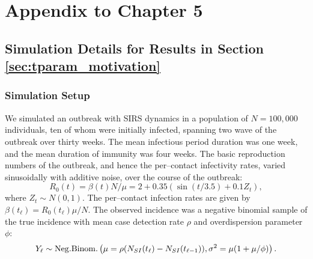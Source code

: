 \chapter{Appendix to Chapter 5}
\label{chap:appendix_ch5}

\section{Simulation Details for Results in Section \ref{sec:tparam_motivation}}
\label{sec:tparam_motiv_details}

\subsection{Simulation Setup}
\label{subsec:tparam_motiv_setup}

We simulated an outbreak with SIRS dynamics in a population of $ N= 100,000$ individuals, ten of whom were initially infected, spanning two wave of the outbreak over thirty weeks. The mean infectious period duration was one week, and the mean duration of immunity was four weeks. The basic reproduction numbers of the outbreak, and hence the per--contact infectivity rates, varied sinusoidally with additive noise, over the course of the outbreak:
\begin{equation}
\label{eqn:sinfoi_true_R0t}
R_0(t) = \beta(t) N / \mu = 2 + 0.35(\sin(t / 3.5) + 0.1Z_t),
\end{equation} 
where $ Z_t \sim N(0,1)$.  The per--contact infection rates are given by $ \beta(t_\ell) = R_0(t_\ell) \mu / N $. The observed incidence was a negative binomial sample of the true incidence with mean case detection rate $ \rho $ and overdispersion parameter $ \phi $: 
\begin{equation}
Y_\ell \sim \mathrm{Neg.Binom.}\left (\mu  = \rho(N_{SI}(t_\ell) - N_{SI}(t_{\ell-1})), \sigma^2 = \mu(1 + \mu /\phi) \right ).
\end{equation}


